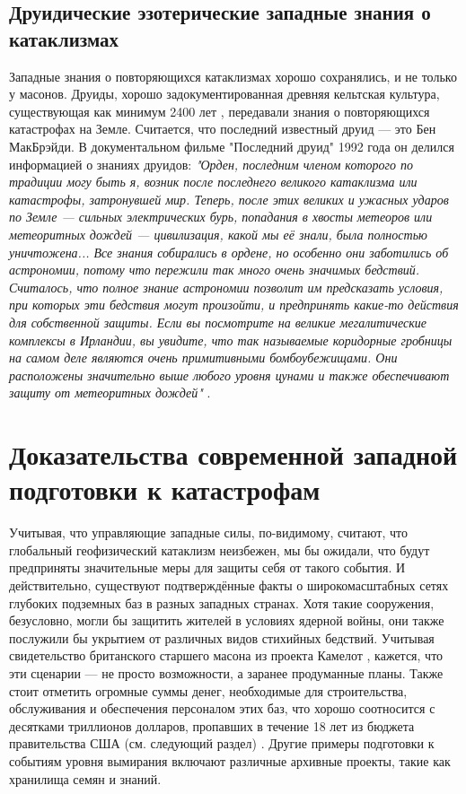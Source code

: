 \documentclass[10pt,twocolumn,letterpaper]{article}
\begin{document}
\subsection{Друидические эзотерические западные знания о катаклизмах}

Западные знания о повторяющихся катаклизмах хорошо сохранялись, и не только у масонов. Друиды, хорошо задокументированная древняя кельтская культура, существующая как минимум 2400 лет \cite{7}, передавали знания о повторяющихся катастрофах на Земле. Считается, что последний известный друид — это Бен МакБрэйди. В документальном фильме "Последний друид" 1992 года он делился информацией о знаниях друидов: \textit{"Орден, последним членом которого по традиции могу быть я, возник после последнего великого катаклизма или катастрофы, затронувшей мир. Теперь, после этих великих и ужасных ударов по Земле — сильных электрических бурь, попадания в хвосты метеоров или метеоритных дождей — цивилизация, какой мы её знали, была полностью уничтожена... Все знания собирались в ордене, но особенно они заботились об астрономии, потому что пережили так много очень значимых бедствий. Считалось, что полное знание астрономии позволит им предсказать условия, при которых эти бедствия могут произойти, и предпринять какие-то действия для собственной защиты. Если вы посмотрите на великие мегалитические комплексы в Ирландии, вы увидите, что так называемые коридорные гробницы на самом деле являются очень примитивными бомбоубежищами. Они расположены значительно выше любого уровня цунами и также обеспечивают защиту от метеоритных дождей"} \cite{8,9}.


\section{Доказательства современной западной подготовки к катастрофам}

Учитывая, что управляющие западные силы, по-видимому, считают, что глобальный геофизический катаклизм неизбежен, мы бы ожидали, что будут предприняты значительные меры для защиты себя от такого события. И действительно, существуют подтверждённые факты о широкомасштабных сетях глубоких подземных баз в разных западных странах. Хотя такие сооружения, безусловно, могли бы защитить жителей в условиях ядерной войны, они также послужили бы укрытием от различных видов стихийных бедствий. Учитывая свидетельство британского старшего масона из проекта Камелот \cite{4,6}, кажется, что эти сценарии — не просто возможности, а заранее продуманные планы. Также стоит отметить огромные суммы денег, необходимые для строительства, обслуживания и обеспечения персоналом этих баз, что хорошо соотносится с десятками триллионов долларов, пропавших в течение 18 лет из бюджета правительства США (см. следующий раздел) \cite{11,12,13}. Другие примеры подготовки к событиям уровня вымирания включают различные архивные проекты, такие как хранилища семян и знаний.
\end{document}
